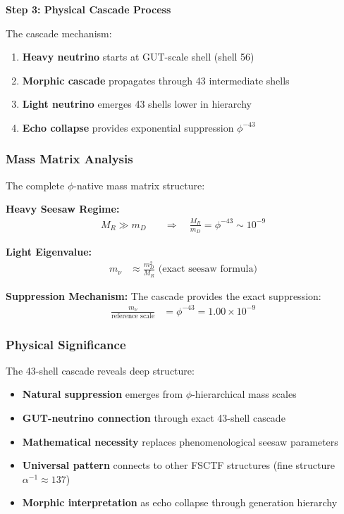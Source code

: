 \textbf{Step 3: Physical Cascade Process}

The cascade mechanism:
\begin{enumerate}
\item \textbf{Heavy neutrino} starts at GUT-scale shell (shell 56)
\item \textbf{Morphic cascade} propagates through 43 intermediate shells
\item \textbf{Light neutrino} emerges 43 shells lower in hierarchy
\item \textbf{Echo collapse} provides exponential suppression $\phi^{-43}$
\end{enumerate}

\subsubsection{Mass Matrix Analysis}

The complete $\phi$-native mass matrix structure:

\textbf{Heavy Seesaw Regime:}
\begin{align}
M_R \gg m_D &\quad \Rightarrow \quad \frac{M_R}{m_D} = \phi^{-43} \sim 10^{-9}
\end{align}

\textbf{Light Eigenvalue:}
\begin{align}
m_\nu &\approx \frac{m_D^2}{M_R} \text{ (exact seesaw formula)}
\end{align}

\textbf{Suppression Mechanism:}
The cascade provides the exact suppression:
\begin{align}
\frac{m_\nu}{\text{reference scale}} &= \phi^{-43} = 1.00 \times 10^{-9}
\end{align}

\subsubsection{Physical Significance}

The 43-shell cascade reveals deep structure:

\begin{itemize}
\item \textbf{Natural suppression} emerges from $\phi$-hierarchical mass scales
\item \textbf{GUT-neutrino connection} through exact 43-shell cascade
\item \textbf{Mathematical necessity} replaces phenomenological seesaw parameters
\item \textbf{Universal pattern} connects to other FSCTF structures (fine structure $\alpha^{-1} \approx 137$)
\item \textbf{Morphic interpretation} as echo collapse through generation hierarchy
\end{itemize}

